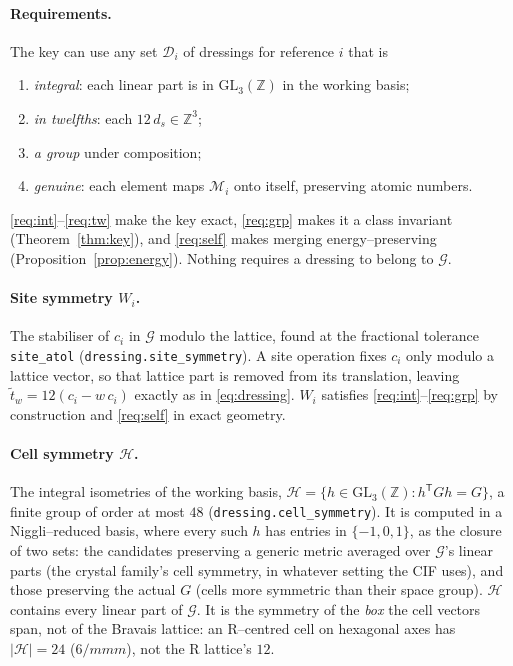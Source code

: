 \documentclass[11pt]{article}
\theoremstyle{definition}
\newcommand{\Grp}{\mathcal{G}}
\newcommand{\Hgrp}{\mathcal{H}}
\newcommand{\Dgrp}{\mathcal{D}}
\begin{document}
\paragraph{Requirements.} The key can use any set $\Dgrp_i$ of dressings for
reference $i$ that is
\begin{enumerate}[leftmargin=2em,label=(R\arabic*)]
\item\label{req:int} \emph{integral}: each linear part is in
  $\mathrm{GL}_3(\mathbb{Z})$ in the working basis;
\item\label{req:tw} \emph{in twelfths}: each $12\,d_s\in\mathbb{Z}^3$;
\item\label{req:grp} \emph{a group} under composition;
\item\label{req:self} \emph{genuine}: each element maps $\mathcal{M}_i$ onto
  itself, preserving atomic numbers.
\end{enumerate}
\ref{req:int}--\ref{req:tw} make the key exact, \ref{req:grp} makes it a class
invariant (Theorem~\ref{thm:key}), and \ref{req:self} makes merging
energy--preserving (Proposition~\ref{prop:energy}). Nothing requires a dressing
to belong to $\Grp$.

\paragraph{Site symmetry $W_i$.} The stabiliser of $c_i$ in $\Grp$ modulo the
lattice, found at the fractional tolerance \texttt{site\_atol}
(\texttt{dressing.site\_symmetry}). A site operation fixes $c_i$ only modulo a
lattice vector, so that lattice part is removed from its translation, leaving
$\widetilde t_w=12(c_i-w\,c_i)$ exactly as in \eqref{eq:dressing}. $W_i$
satisfies \ref{req:int}--\ref{req:grp} by construction and \ref{req:self} in
exact geometry.

\paragraph{Cell symmetry $\Hgrp$.} The integral isometries of the working
basis, $\Hgrp=\{h\in\mathrm{GL}_3(\mathbb{Z}):h^{\mathsf T}Gh=G\}$, a finite
group of order at most $48$ (\texttt{dressing.cell\_symmetry}). It is computed in
a Niggli--reduced basis, where every such $h$ has entries in $\{-1,0,1\}$, as the
closure of two sets: the candidates preserving a generic metric averaged over
$\Grp$'s linear parts (the crystal family's cell symmetry, in whatever setting
the CIF uses), and those preserving the actual $G$ (cells more symmetric than
their space group). $\Hgrp$ contains every linear part of $\Grp$. It is the
symmetry of the \emph{box} the cell vectors span, not of the Bravais lattice: an
R--centred cell on hexagonal axes has $|\Hgrp|=24$ ($6/mmm$), not the R
lattice's $12$.
\end{document}
